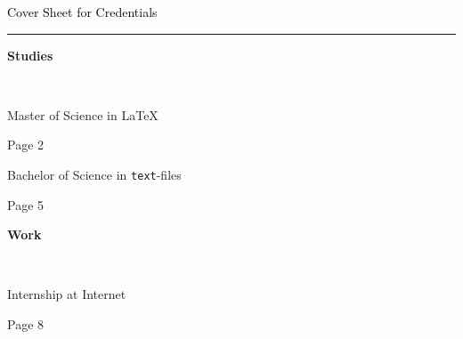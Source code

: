 \documentclass{scrartcl}
\date{}
\newcommand{\colorOne}{mycolor}
\newlength{\boxA}\settowidth{\boxA}{Geburtsdatum und ort}
\newlength{\boxC}\settowidth{\boxC}{So lange muss diese Zeile sein oder sogar länger, mal gucken noch etwas mehr mehr}
\newcommand{\NewData}[2]{\noindent \parbox{\boxA}{#1}\hspace{1em}#2\vspace{0em}}
\newcommand{\NewAnlage}[2]{\noindent \parbox[t]{\boxC}{#1}\hspace{1em}\parbox[t]{\boxA}{#2}}
\begin{document}
\pagestyle{empty}
\noindent \textcolor{black}{\Large Cover Sheet for Credentials}\vspace{-0.27em}
\\
\rule{\textwidth}{0.04em}\vspace{1em}

\vspace{1em}

\NewData{\textcolor{\colorOne}{\textbf{Studies}}}{~}

\vspace{1em}

\NewAnlage{Master of Science in \LaTeX}{Page 2}

\vspace{1em}

\NewAnlage{Bachelor of Science in \texttt{text}-files }{Page 5}

\vspace{1.5em}

\NewData{\textcolor{\colorOne}{\textbf{Work}}}{~}

\vspace{1em}

\NewAnlage{Internship at Internet}{Page 8}
    
\end{document}
